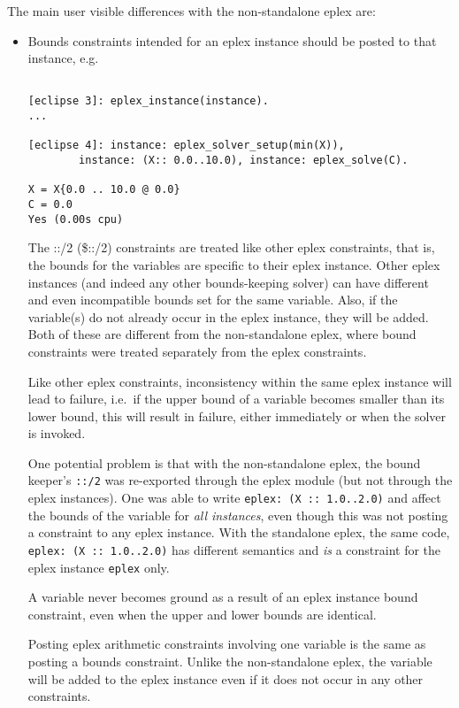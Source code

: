 The main user visible differences with the non-standalone eplex are:

\begin{sloppypar}
\begin{itemize}
\item Bounds constraints intended for an eplex instance should be posted to
that instance, e.g.

\begin{verbatim}

[eclipse 3]: eplex_instance(instance).
...

[eclipse 4]: instance: eplex_solver_setup(min(X)), 
        instance: (X:: 0.0..10.0), instance: eplex_solve(C).

X = X{0.0 .. 10.0 @ 0.0}
C = 0.0
Yes (0.00s cpu)

\end{verbatim}

The ::/2 (\$::/2) constraints are treated like other eplex constraints,
 that is, the bounds for the variables are specific to their eplex
 instance. Other eplex instances (and indeed any other bounds-keeping
 solver) can have different and even incompatible bounds set for the same
 variable. Also, if the variable(s) do not already occur in the eplex
 instance, they will be added. Both of these are different from the
 non-standalone eplex, where bound constraints were treated
 separately from the eplex constraints.

Like other eplex constraints, inconsistency within the same eplex instance
 will lead to failure, i.e.\ if the upper bound of a variable becomes
 smaller than its lower bound, this will result in failure, either
 immediately or when the solver is invoked.

One potential problem is that with the non-standalone eplex, the bound
keeper's \verb'::/2' was re-exported through the eplex module (but not
through the eplex instances). One was able to write
\verb'eplex: (X :: 1.0..2.0)'
and affect the bounds of the variable for {\it all instances},
even though this was not posting a constraint to any eplex instance.
With the standalone eplex, the same code, \verb'eplex: (X :: 1.0..2.0)' has
different semantics and {\it is\/} a constraint for the eplex instance
\verb'eplex' only. 

A variable never becomes ground as a result of an eplex instance bound
constraint, even when the upper and lower bounds are identical. 

Posting eplex arithmetic constraints involving one variable is the
same as posting a bounds constraint. Unlike the non-standalone eplex, the
variable will be added to the eplex instance even if it does not occur in
any other constraints.


\end{itemize}
\end{sloppypar}
